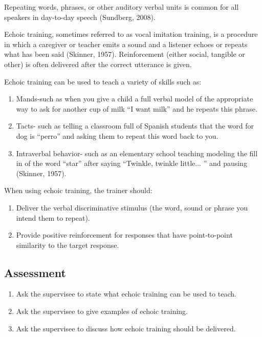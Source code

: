 Repeating words, phrases, or other auditory verbal units is common for all speakers in day-to-day speech (Sundberg, 2008).

Echoic training, sometimes referred to as vocal imitation training, is a procedure in which a caregiver or teacher emits a sound and a listener echoes or repeats what has been said (Skinner, 1957).  Reinforcement (either social, tangible or other) is often delivered after the correct utterance is given.  

Echoic training can be used to teach a variety of skills such as:
\begin{enumerate}
\item Mands-such as when you give a child a full verbal model of the appropriate way to ask for another cup of milk ``I want milk'' and he repeats this phrase.
\item Tacts- such as telling a classroom full of Spanish students that the word for dog is ``perro'' and asking them to repeat this word back to you.
\item Intraverbal behavior- such as an elementary school teaching modeling the fill in of the word ``star'' after saying ``Twinkle, twinkle little... '' and pausing (Skinner, 1957).
\end{enumerate}

When using echoic training, the trainer should:
\begin{enumerate}
\item Deliver the verbal discriminative stimulus (the word, sound or phrase you intend them to repeat).
\item Provide positive reinforcement for responses that have point-to-point similarity to the target response.  
\end{enumerate}
%
\subsection{Assessment}
\begin{enumerate}
\item Ask the supervisee to state what echoic training can be used to teach.
\item Ask the supervisee to give examples of echoic training.
\item Ask the supervisee to discuss how echoic training should be delivered.
\end{enumerate}
%
